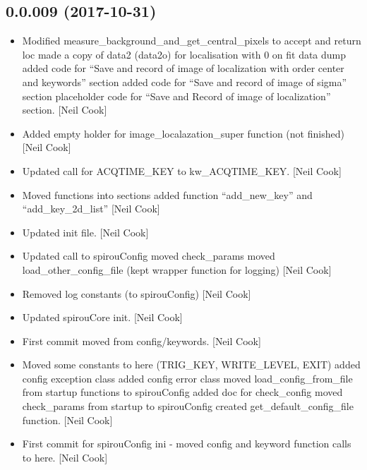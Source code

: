 \documentclass[a4paper,10pt,english]{report}
\begin{document}
\subsection{0.0.009 (2017-10-31)}
\label{\detokenize{misc/changelog:id540}}\begin{itemize}
\item {} 
Modified measure\_background\_and\_get\_central\_pixels to accept and
return loc made a copy of data2  (data2o) for localisation with 0 on
fit data dump added code for “Save and record of image of localization
with order center and keywords” section added code for “Save and
record of image of sigma” section placeholder code for “Save and
Record of image of localization” section. {[}Neil Cook{]}

\item {} 
Added empty holder for image\_localazation\_super function (not
finished) {[}Neil Cook{]}

\item {} 
Updated call for ACQTIME\_KEY to kw\_ACQTIME\_KEY. {[}Neil Cook{]}

\item {} 
Moved functions into sections added function “add\_new\_key” and
“add\_key\_2d\_list” {[}Neil Cook{]}

\item {} 
Updated init file. {[}Neil Cook{]}

\item {} 
Updated call to spirouConfig moved check\_params moved
load\_other\_config\_file (kept wrapper function for logging) {[}Neil Cook{]}

\item {} 
Removed log constants (to spirouConfig) {[}Neil Cook{]}

\item {} 
Updated spirouCore init. {[}Neil Cook{]}

\item {} 
First commit moved from config/keywords. {[}Neil Cook{]}

\item {} 
Moved some constants to here (TRIG\_KEY, WRITE\_LEVEL, EXIT) added
config exception class added config error class moved
load\_config\_from\_file from startup functions to spirouConfig added doc
for check\_config moved check\_params from startup to spirouConfig
created get\_default\_config\_file function. {[}Neil Cook{]}

\item {} 
First commit for spirouConfig ini - moved config and keyword function
calls to here. {[}Neil Cook{]}


\end{itemize}
\end{document}
